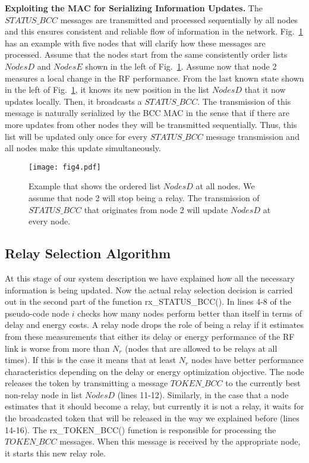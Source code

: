 \documentclass[10pt]{IEEEtran}
\newcounter{section:outage-analysis}
\begin{document}
\textbf{Exploiting the MAC for Serializing Information Updates.}
The $STATUS\_BCC$ messages are transmitted and processed sequentially by all nodes and this ensures consistent and reliable flow of information in the network.  Fig.~\ref{fig:example-status-bcc-message} has an example with five nodes that will clarify how these messages are processed. Assume that the nodes start from the same consistently order lists $NodesD$ and $NodesE$ shown in the left of Fig.~\ref{fig:example-status-bcc-message}. Assume now that node 2 measures a local change in the RF performance. From the last known state shown in the left of Fig.~\ref{fig:example-status-bcc-message}, it knows its new position in the list $NodesD$ that it now updates locally. Then, it broadcasts a $STATUS\_BCC$. The transmission of this message is naturally serialized by the BCC MAC in the sense that if there are more updates from other nodes they will be transmitted sequentially. Thus, this list will be updated only once for every $STATUS\_BCC$ message transmission and all nodes make this update simultaneously.

\begin{figure}[t]
\texttt{[image: fig4.pdf]}
\caption{Example that shows the ordered list $NodesD$ at all nodes. We assume that node 2 will stop being a relay. The transmission of $STATUS\_BCC$ that originates from node 2 will update $NodesD$ at every node.
}
\label{fig:example-status-bcc-message}
\end{figure}



\subsection{Relay Selection Algorithm}
\label{subsection:3}
At this stage of our system description we have explained how all the necessary information is being updated. Now the actual relay selection decision is carried out in the second part of the function rx\_STATUS\_BCC(). In lines 4-8 of the pseudo-code node $i$ checks how many nodes perform better than itself in terms of delay and energy costs. A relay node drops the role of being a relay if it estimates from these measurements that either its delay or energy performance of the RF link is worse from more than $N_r$ (nodes that are allowed to be relays at all times). If this is the case it means that at least $N_r$ nodes have better performance characteristics depending on the delay or energy optimization objective. The node releases the token by transmitting a message $TOKEN\_BCC$ to the currently best non-relay node in list $NodesD$ (lines 11-12). Similarly, in the case that a node estimates that it should become a relay, but currently it is not a relay, it waits for the broadcasted token that will be released in the way we explained before (lines 14-16). The rx\_TOKEN\_BCC() function is responsible for processing the $TOKEN\_BCC$ messages. When this message is received by the appropriate node, it starts this new relay role.
\end{document}
